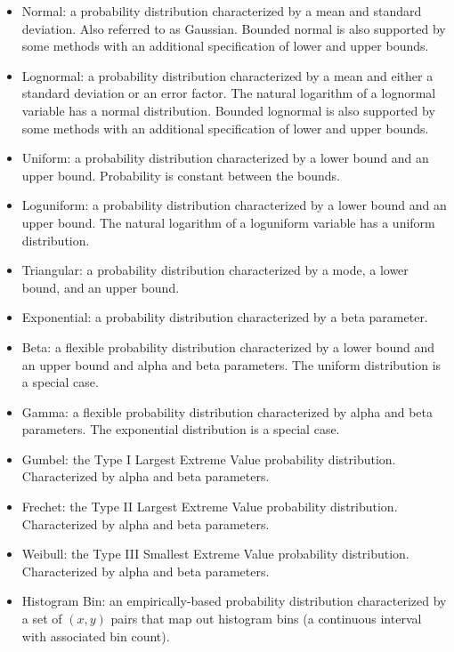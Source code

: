 \begin{itemize}

\item Normal: a probability distribution characterized by a mean and 
  standard deviation. Also referred to as Gaussian. Bounded normal is
  also supported by some methods with an additional specification of
  lower and upper bounds.

\item Lognormal: a probability distribution characterized by a mean 
  and either a standard deviation or an error factor. The natural
  logarithm of a lognormal variable has a normal distribution. Bounded
  lognormal is also supported by some methods with an additional
  specification of lower and upper bounds.

\item Uniform: a probability distribution characterized by a lower bound 
  and an upper bound.  Probability is constant between the bounds.

\item Loguniform: a probability distribution characterized by a lower 
  bound and an upper bound.  The natural logarithm of a loguniform
  variable has a uniform distribution.

\item Triangular: a probability distribution characterized by a mode, a 
  lower bound, and an upper bound.

\item Exponential: a probability distribution characterized by a beta parameter.

\item Beta: a flexible probability distribution characterized by a lower 
  bound and an upper bound and alpha and beta parameters.  The uniform 
  distribution is a special case.

\item Gamma: a flexible probability distribution characterized by alpha 
  and beta parameters.  The exponential distribution is a special case.

\item Gumbel: the Type I Largest Extreme Value probability distribution.  
  Characterized by alpha and beta parameters.

\item Frechet: the Type II Largest Extreme Value probability distribution.  
  Characterized by alpha and beta parameters.

\item Weibull: the Type III Smallest Extreme Value probability distribution.  
  Characterized by alpha and beta parameters.

\item Histogram Bin: an empirically-based probability distribution 
  characterized by a set of $(x,y)$ pairs that map out
  histogram bins (a continuous interval with associated bin count).

\end{itemize}

